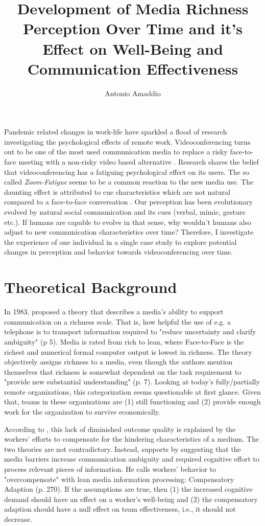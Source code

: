 \documentclass[man]{apa7}
\title{Development of Media Richness Perception Over Time and it's Effect on Well-Being and Communication Effectiveness}
\author{Antonio Amaddio}
\affiliation{Freie Universität Berlin \\ A\&O Vertiefung, Winter 2022/23, Supervisor: Dr. Lisa Handke}
\begin{document}
\maketitle
Pandemic related changes in work-life have sparkled a flood of research investigating the psychological effects of remote work. Videoconferencing turns out to be one of the most used communication media to replace a risky face-to-face meeting with a non-risky video based alternative \parencite{Riedl2021}.  Research shares the belief that videoconferencing has a fatiguing psychological effect on its users. The so called \textit{Zoom-Fatigue} seems to be a common reaction to the new media use. The daunting effect is attributed to cue characteristics which are not natural compared to a face-to-face conversation \parencite{Riedl2021}. Our perception has been evolutionary evolved by natural social communication and its cues (verbal, mimic, gesture etc.). If humans are capable to evolve in that sense, why wouldn't humans also adjust to new communication characteristics over time? Therefore, I investigate the experience of one individual in a single case study to explore potential changes in perception and behavior towards videoconferencing over time.

\section{Theoretical Background}

In 1983, \citeauthor{daft1983information} proposed a theory that describes a media's ability to support communication on a richness scale. That is, how helpful the use of e.g. a telephone is to transport information required to "reduce uncertainty and clarify ambiguity" (p 5). Media is rated from rich to lean, where Face-to-Face is the richest and numerical formal computer output is lowest in richness. The theory objectively assigns richness to a media, even though the authors mention themselves that richness is somewhat dependent on the task requirement to "provide new substantial understanding" (p. 7). Looking at today's fully/partially remote organizations, this categorization seems questionable at first glance. Given that, teams in these organizations are (1) still functioning and (2) provide enough work for the organization to survive economically.

According to \citeauthor{Kock2005}, this lack of diminished outcome quality is explained by the workers' efforts to compensate for the hindering characteristics of a medium. The two theories are not contradictory. Instead, \citeauthor{Kock2005} supports by suggesting that the media barriers increase communication ambiguity and required cognitive effort to process relevant pieces of information. He calls workers' behavior to "overcompensate" with lean media information processing: Compensatory Adaption (p. 270). If the assumptions are true, then (1) the increased cognitive demand should have an effect on a worker's well-being and (2) the compensatory adaption should have a null effect on team effectiveness, i.e., it should not decrease.
\end{document}
